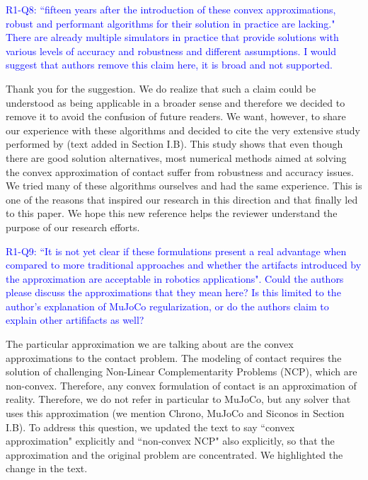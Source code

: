 \textcolor{blue}{R1-Q8: ``fifteen years after the introduction of these convex
approximations, robust and performant algorithms for their solution in practice
are lacking." There are already multiple simulators in practice that provide
solutions with various levels of accuracy and robustness and different
assumptions. I would suggest that authors remove this claim here, it is broad
and not supported.}

Thank you for the suggestion. We do realize that such a claim could be
understood as being applicable in a broader sense and therefore we decided to
remove it to avoid the confusion of future readers. We want, however, to share
our experience with these algorithms and decided to cite the very extensive
study performed by \cite{bib:acary2018solving} (text added in Section I.B). This
study shows that even though there are good solution alternatives, most
numerical methods aimed at solving the convex approximation of contact suffer
from robustness and accuracy issues. We tried many of these algorithms ourselves
and had the same experience. This is one of the reasons that inspired our
research in this direction and that finally led to this paper. We hope this new
reference helps the reviewer understand the purpose of our research efforts.
\vspace{5mm}

\textcolor{blue}{R1-Q9: ``It is not yet clear if these formulations present a real
advantage when compared to more traditional approaches and whether the artifacts
introduced by the approximation are acceptable in robotics applications". Could
the authors please discuss the approximations that they mean here? Is this
limited to the author's explanation of MuJoCo regularization, or do the authors
claim to explain other artififacts as well?}

The particular approximation we are talking about are the convex approximations
to the contact problem. The modeling of contact requires the solution of
challenging Non-Linear Complementarity Problems (NCP), which are non-convex.
Therefore, any convex formulation of contact is an approximation of reality.
Therefore, we do not refer in particular to MuJoCo, but any solver that uses
this approximation (we mention Chrono, MuJoCo and Siconos in Section I.B).
To address this question, we updated the text to say ``convex approximation"
explicitly and ``non-convex NCP" also explicitly, so that the approximation
and the original problem are concentrated. We highlighted the change in the
text.
